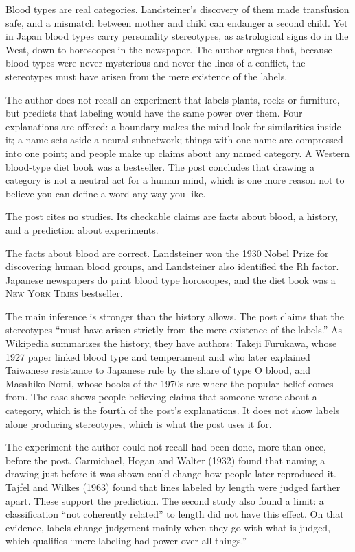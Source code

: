 \begin{afterword}
\summaryhead

Blood types are real categories. Landsteiner's discovery of them made transfusion safe, and a mismatch between mother and child can endanger a second child. Yet in Japan blood types carry personality stereotypes, as astrological signs do in the West, down to horoscopes in the newspaper. The author argues that, because blood types were never mysterious and never the lines of a conflict, the stereotypes must have arisen from the mere existence of the labels.

The author does not recall an experiment that labels plants, rocks or furniture, but predicts that labeling would have the same power over them. Four explanations are offered: a boundary makes the mind look for similarities inside it; a name sets aside a neural subnetwork; things with one name are compressed into one point; and people make up claims about any named category. A Western blood-type diet book was a bestseller. The post concludes that drawing a category is not a neutral act for a human mind, which is one more reason not to believe you can define a word any way you like.

\responsehead

The post cites no studies. Its checkable claims are facts about blood, a history, and a prediction about experiments.

The facts about blood are correct. Landsteiner won the 1930 Nobel Prize for discovering human blood groups, and Landsteiner also identified the Rh factor. Japanese newspapers do print blood type horoscopes, and the diet book was a \textsc{New York Times} bestseller.

The main inference is stronger than the history allows. The post claims that the stereotypes ``must have arisen strictly from the mere existence of the labels.'' As Wikipedia summarizes the history, they have authors: Takeji Furukawa, whose 1927 paper linked blood type and temperament and who later explained Taiwanese resistance to Japanese rule by the share of type O blood, and Masahiko Nomi, whose books of the 1970s are where the popular belief comes from. The case shows people believing claims that someone wrote about a category, which is the fourth of the post's explanations. It does not show labels alone producing stereotypes, which is what the post uses it for.

The experiment the author could not recall had been done, more than once, before the post. Carmichael, Hogan and Walter (1932) found that naming a drawing just before it was shown could change how people later reproduced it. Tajfel and Wilkes (1963) found that lines labeled by length were judged farther apart. These support the prediction. The second study also found a limit: a classification ``not coherently related'' to length did not have this effect. On that evidence, labels change judgement mainly when they go with what is judged, which qualifies ``mere labeling had power over all things.''


\end{afterword}
